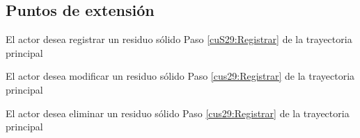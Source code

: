 \subsection{Puntos de extensión}

\UCExtensionPoint
{El actor desea registrar un residuo sólido}
{ Paso \ref{cuS29:Registrar} de la trayectoria principal}
{}

\UCExtensionPoint
{El actor desea modificar un residuo sólido}
{ Paso \ref{cus29:Registrar} de la trayectoria principal}
{}

\UCExtensionPoint
{El actor desea eliminar un residuo sólido}
{ Paso \ref{cus29:Registrar} de la trayectoria principal}
{}
